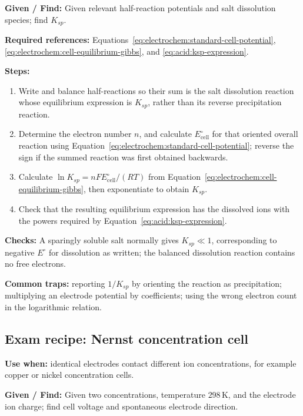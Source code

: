 \textbf{Given / Find:} Given relevant half-reaction potentials and salt dissolution species; find \(K_{sp}\).

\textbf{Required references:} Equations~\eqref{eq:electrochem:standard-cell-potential}, \eqref{eq:electrochem:cell-equilibrium-gibbs}, and \eqref{eq:acid:ksp-expression}.


\textbf{Steps:}
\begin{enumerate}
    \item Write and balance half-reactions so their sum is the salt dissolution reaction whose equilibrium expression is \(K_{sp}\), rather than its reverse precipitation reaction.
    \item Determine the electron number \(n\), and calculate \(E^\circ_{\mathrm{cell}}\) for that oriented overall reaction using Equation~\eqref{eq:electrochem:standard-cell-potential}; reverse the sign if the summed reaction was first obtained backwards.
    \item Calculate \(\ln K_{sp}=nFE^\circ_{\mathrm{cell}}/(RT)\) from Equation~\eqref{eq:electrochem:cell-equilibrium-gibbs}, then exponentiate to obtain \(K_{sp}\).
    \item Check that the resulting equilibrium expression has the dissolved ions with the powers required by Equation~\eqref{eq:acid:ksp-expression}.
\end{enumerate}

\textbf{Checks:} A sparingly soluble salt normally gives \(K_{sp}\ll1\), corresponding to negative \(E^\circ\) for dissolution as written; the balanced dissolution reaction contains no free electrons.

\textbf{Common traps:} reporting \(1/K_{sp}\) by orienting the reaction as precipitation; multiplying an electrode potential by coefficients; using the wrong electron count in the logarithmic relation.

\subsection{Exam recipe: Nernst concentration cell}
\textbf{Use when:} identical electrodes contact different ion concentrations, for example copper or nickel concentration cells.

\textbf{Given / Find:} Given two concentrations, temperature \(298\,\mathrm K\), and the electrode ion charge; find cell voltage and spontaneous electrode direction.

